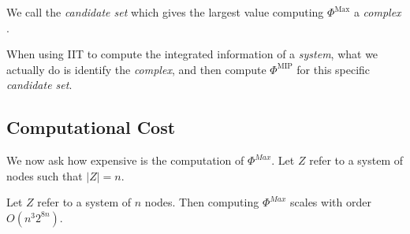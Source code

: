 \begin{definition}
	We call the \textit{candidate set} which gives the largest value computing $\Phi^{\text{Max}}$ a \textit{complex} \cite{oizumi2014phenomenology}.
\end{definition}

When using IIT to compute the integrated information of a \textit{system}, what we actually do is identify the \textit{complex}, and then compute $\Phi^{\text{MIP}}$ for this specific \textit{candidate set}.

\subsection{Computational Cost}
We now ask how expensive is the computation of $\Phi^{Max}$. Let $Z$ refer to a system of nodes such that $|Z| = n$.

\begin{theorem}
	Let $Z$ refer to a system of $n$ nodes. Then computing $\Phi^{Max}$ scales with order $O(n^3 2^{8n})$.
\end{theorem}

